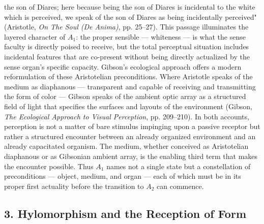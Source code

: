 the son of Diares; here because being the son of Diares is incidental to the white which is perceived, we speak of the son of Diares as being incidentally perceived" (Aristotle, \textit{On The Soul (De Anima)}, pp. 25--27). This passage illuminates the layered character of $A_1$: the proper sensible --- whiteness --- is what the sense faculty is directly poised to receive, but the total perceptual situation includes incidental features that are co-present without being directly actualized by the sense organ's specific capacity. Gibson's ecological approach offers a modern reformulation of these Aristotelian preconditions. Where Aristotle speaks of the medium as diaphanous --- transparent and capable of receiving and transmitting the form of color --- Gibson speaks of the ambient optic array as a structured field of light that specifies the surfaces and layouts of the environment (Gibson, \textit{The Ecological Approach to Visual Perception}, pp. 209--210). In both accounts, perception is not a matter of bare stimulus impinging upon a passive receptor but rather a structured encounter between an already organized environment and an already capacitated organism. The medium, whether conceived as Aristotelian diaphanous or as Gibsonian ambient array, is the enabling third term that makes the encounter possible. Thus $A_1$ names not a single state but a constellation of preconditions --- object, medium, and organ --- each of which must be in its proper first actuality before the transition to $A_2$ can commence. 

\subsection*{3. Hylomorphism and the Reception of Form}

